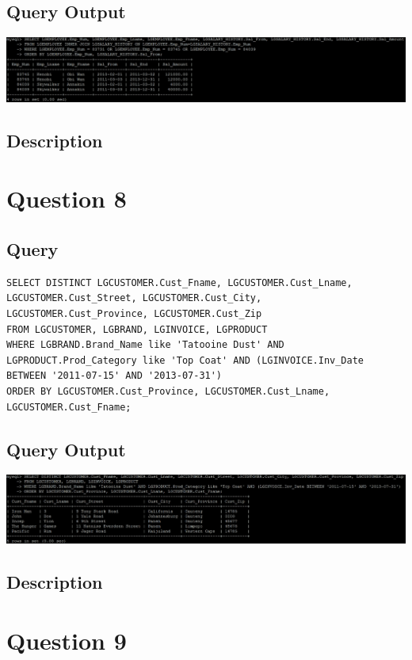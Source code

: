 \documentclass[a4paper,10pt]{article}
\begin{document}
\subsection{Query Output}
           \includegraphics{Queries/Question_7/Q7_screenshot.jpg}
\subsection{Description}
\section*{Question 8}
 \subsection{Query}
          \lstset{
            language=SQL,
            breaklines=true
            }
        \begin{lstlisting}[frame=single]
        SELECT DISTINCT LGCUSTOMER.Cust_Fname, LGCUSTOMER.Cust_Lname, LGCUSTOMER.Cust_Street, LGCUSTOMER.Cust_City, LGCUSTOMER.Cust_Province, LGCUSTOMER.Cust_Zip
FROM LGCUSTOMER, LGBRAND, LGINVOICE, LGPRODUCT
WHERE LGBRAND.Brand_Name like 'Tatooine Dust' AND LGPRODUCT.Prod_Category like 'Top Coat' AND (LGINVOICE.Inv_Date BETWEEN '2011-07-15' AND '2013-07-31')
ORDER BY LGCUSTOMER.Cust_Province, LGCUSTOMER.Cust_Lname, LGCUSTOMER.Cust_Fname;

        \end{lstlisting}
\subsection{Query Output}
           \includegraphics{Queries/Question_8/Q8_screenshot.jpg}
\subsection{Description}
\section*{Question 9}
\end{document}

